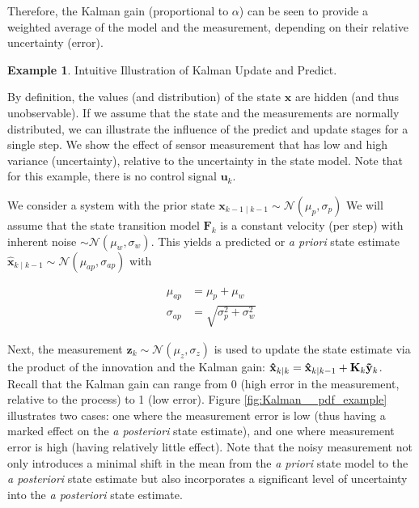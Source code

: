 \documentclass[12pt]{book}
\theoremstyle{definition}
\newtheorem{exmp}{Example}[chapter]
\begin{document}
Therefore, the Kalman gain (proportional to \(\alpha \)) can be seen to provide a weighted average of the model and the measurement, depending on their relative uncertainty (error).


\bigskip

\begin{tcolorbox}
    \begin{exmp}{Intuitive Illustration of  Kalman Update and Predict.}

    By definition, the values (and distribution) of the state \(\mathbf{x}\) are hidden (and thus unobservable). If we assume that the state and the measurements are normally distributed, we can illustrate the influence of the predict and update stages for a single step.  We show the effect of sensor measurement that has low and high variance (uncertainty), relative to the uncertainty in the state model. Note that for this example, there is no control signal \(\mathbf{u}_k\).
        
    \end{exmp}
\end{tcolorbox}

We consider a system with the prior state \(\mathbf{x}_{k-1 \mid k-1} \sim \mathcal{N}(\mu_{p},\sigma_p)\) We will assume that the state transition model \(\mathbf{F}_k\) is a constant velocity (per step) with inherent noise \( \sim \mathcal{N}(\mu_{w},\sigma_w) \). This yields a  predicted or \emph{a priori} state estimate \( \mathbf{\hat{x}}_{k\mid k-1} \sim \mathcal{N}(\mu_{ap},\sigma_{ap})\) with 

\[
\begin{aligned}
   \mu_{ap} & = \mu_p + \mu_w \\
   \sigma_{ap} & = \sqrt{\sigma_p^2 + \sigma_w^2}
\end{aligned}
\]

Next, the measurement \(\mathbf{z}_k 
 \sim \mathcal{N}(\mu_z,\sigma_z)\) is used to update the state estimate via the product of the innovation and the Kalman gain: $\mathbf{\hat{x}}_{k\mid k}  = \mathbf{\hat{x}}_{k\mid k-1} + \mathbf{K}_k \mathbf{\Tilde{y}}_k$.\\

Recall that the Kalman gain can range from 0 (high error in the measurement, relative to the process)  to 1 (low error).
 Figure \ref{fig:Kalman__pdf_example} illustrates two cases: one where the measurement error is low (thus having a marked effect on the  \emph{a posteriori} state estimate), and one where measurement error is high (having relatively little effect). Note that the noisy measurement not only introduces a minimal shift in the mean from the \emph{a priori} state model to the \emph{a posteriori} state estimate but also incorporates a significant level of uncertainty into the \emph{a posteriori} state estimate.
\end{document}
